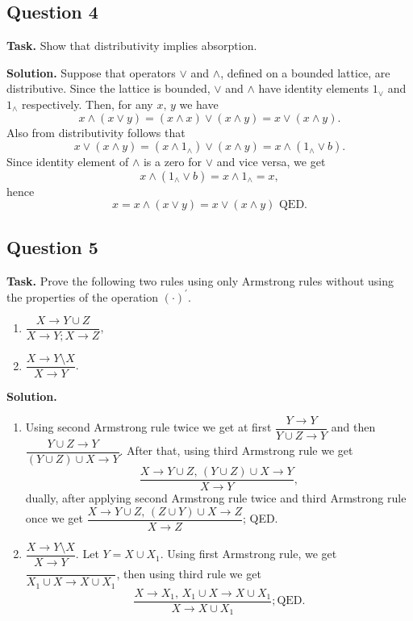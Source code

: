 \documentclass[14pt,a4paper]{extarticle}
\begin{document}
	\newpage
	\subsection*{Question 4}
	
	\noindent\textbf{Task.}  Show that distributivity implies absorption.
	
	\noindent\textbf{Solution.} Suppose that operators $\lor$ and $\land$, defined on a bounded lattice, are distributive. Since the lattice is bounded, $\lor$ and $\land$ have identity elements $1_{\lor}$ and $1_{\land}$ respectively. Then, for any $x,\, y$ we have
	\[x\land(x\lor y)= (x\land x)\lor(x\land y) = x\lor(x\land y).\]
	Also from distributivity follows that
	\[x\lor(x\land y) = (x\land 1_{\land})\lor(x\land y) = x\land (1_{\land}\lor b).\]
	Since identity element of $\land$ is a zero for $\lor$ and vice versa, we get
	\[x\land (1_{\land}\lor b) = x\land1_{\land}=x,\]
	hence
	\[x = x\land(x\lor y) = x\lor(x\land y)\text{ QED}.\]
	\newpage
	\subsection*{Question 5}
	
	\noindent\textbf{Task.}  Prove the following two rules using only Armstrong rules without using the properties of the operation $(\cdot)^\prime$.
	\begin{enumerate}
		\item $\dfrac{X\rightarrow Y\cup Z}{X\rightarrow Y; X\rightarrow Z}$,
		\item $\dfrac{X \rightarrow Y\setminus X}{X \rightarrow Y}$.
	\end{enumerate}
	\noindent\textbf{Solution.} 
	\begin{enumerate}
		\item Using second Armstrong rule twice we get at first $\dfrac{Y\rightarrow Y}{Y\cup Z\rightarrow Y}$ and then $\dfrac{Y\cup Z\rightarrow Y}{(Y\cup Z) \cup X\rightarrow Y}$. After that, using third Armstrong rule we get 
		\[\dfrac{X\rightarrow Y\cup Z,\, (Y \cup Z) \cup X \rightarrow Y}{X\rightarrow Y},\]
		dually, after applying second Armstrong rule twice and third Armstrong rule once we get $\dfrac{X\rightarrow Y\cup Z,\, (Z \cup Y) \cup X \rightarrow Z}{X\rightarrow Z}$; QED.
		\item $\dfrac{X \rightarrow Y\setminus X}{X \rightarrow Y}$. Let $Y=X\cup X_1$. Using first Armstrong rule, we get $\dfrac{}{X_1\cup X\rightarrow X\cup X_1}$, then using third rule we get 
		\[\dfrac{X\rightarrow X_1,\, X_1\cup X\rightarrow X\cup X_1}{X\rightarrow X\cup X_1}; \text{QED}.\]
	\end{enumerate}
\end{document}
